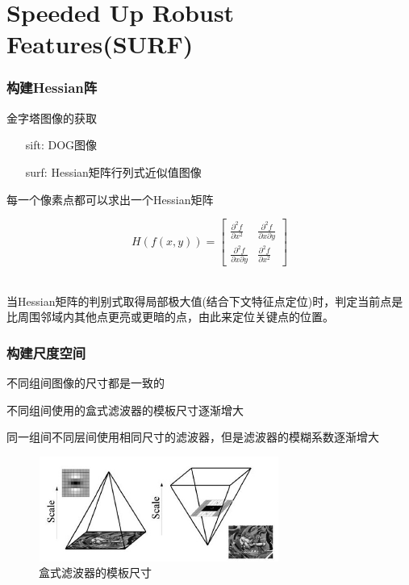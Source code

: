\documentclass[presentation,aspectratio=1610]{beamer}
\begin{document}
\section[SURF]{Speeded Up Robust Features(SURF)}
\begin{frame}
	\frametitle{构建Hessian阵}
	金字塔图像的获取
	\begin{itemize}
		\item[sift:] DOG图像
		\item[surf:] Hessian矩阵行列式近似值图像
	\end{itemize}
	 \vspace{.5cm}
	
	每一个像素点都可以求出一个Hessian矩阵	
	
	$$ H(f(x, y))=\left[ \begin{array}{cc}{\frac{\partial^{2} f}{\partial x^{2}}} & {\frac{\partial^{2} f}{\partial x \partial y}} \\ {\frac{\partial^{2} f}{\partial x \partial y}} & {\frac{\partial^{2} f}{\partial x^{2}}}\end{array}\right]$$　\pause
	
	当Hessian矩阵的判别式取得局部极大值(结合下文特征点定位)时，判定当前点是比周围邻域内其他点更亮或更暗的点，由此来定位关键点的位置。
\end{frame}

\begin{frame}
	\frametitle{构建尺度空间}
	不同组间图像的尺寸都是一致的
	
	不同组间使用的盒式滤波器的模板尺寸逐渐增大
	
	同一组间不同层间使用相同尺寸的滤波器，但是滤波器的模糊系数逐渐增大
	
	\begin{figure}[htbp!]
		\centering
		\includegraphics[width=0.7\textwidth]{img/filter3.jpg}
		\caption{盒式滤波器的模板尺寸}
	\end{figure}
\end{frame}
\end{document}
